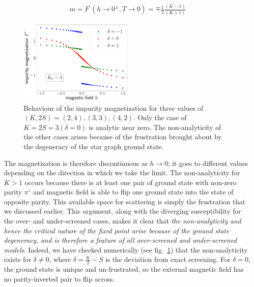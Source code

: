\documentclass[reprint,prb,superscriptaddress]{revtex4-2}
\begin{document}
\begin{equation}\begin{aligned}
	m = F^\prime(h \to 0^\pm, T\to 0) = \mp \frac{1}{2}\frac{(K-1)}{(K+1)}
\end{aligned}\end{equation}
\begin{figure}[!htpb]
	\centering
	\includegraphics[width=0.5\textwidth]{../numerics/disc_mag_imp_gen.pdf}
	\caption{Behaviour of the impurity magnetization for three values of \(\left(K, 2S\right) = \left(2, 4\right), \left( 3,3 \right), \left(4, 2\right)  \). Only the case of \(K=2S=3 \left(\delta=0\right)\) is analytic near zero. The non-analyticity of the other cases arises because of the frustration brought about by the degeneracy of the star graph ground state.}
	\label{mag_crit}
\end{figure}

The magnetization is therefore discontinuous as \(h\to 0\); it goes to different values depending on the direction in which we take the limit. The non-analyticity for \(K>1\) occurs because there is at least one pair of ground state with non-zero parity \(\pi^z\) and magnetic field is able to flip one ground state into the state of opposite parity. This available space for scattering is simply the frustration that we discussed earlier. This argument, along with the diverging susceptibility for the over- and under-screened cases, makes it clear that \textit{the non-analyticity and hence the critical nature of the fixed point arise because of the ground state degeneracy, and is therefore a feature of all over-screened and under-screened  models}. Indeed, we have checked numerically (see fig.~\ref{mag_crit}) that the non-analyticity exists for \(\delta \neq 0\), where \(\delta = \frac{K}{2} - S\) is the deviation from exact screening. For \(\delta=0\), the ground state is unique and un-frustrated, so the external magnetic field has no parity-inverted pair to flip across.
\end{document}
